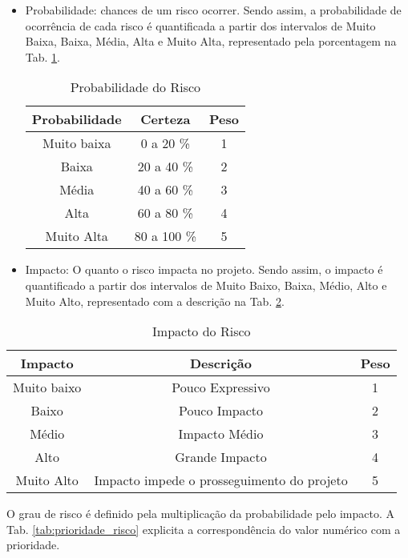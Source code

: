 \begin{itemize}
\item Probabilidade: chances de um risco ocorrer. Sendo assim, a probabilidade de ocorrência de cada risco é quantificada a partir dos intervalos de Muito Baixa, Baixa, Média, Alta e Muito Alta, representado pela porcentagem na Tab. \ref{tab:probabilidade}.

\begin{table}[H]
\centering
\caption{Probabilidade do Risco}
\label{tab:probabilidade}
\begin{tabular}{|c|c|c|}
\hline
\rowcolor[HTML]{A8DADC}
\textbf{Probabilidade} & \textbf{Certeza} & \textbf{Peso} \\ \hline
Muito baixa	 & 0 a 20 \% & 1
 \\ \hline
Baixa & 20 a 40 \% & 2 \\ \hline
Média & 40 a 60 \% & 3 \\ \hline
Alta & 60 a 80 \% & 4 \\ \hline
Muito Alta & 80 a 100 \% & 5 \\ \hline
\end{tabular}
\end{table}

\item Impacto: O quanto o risco impacta no projeto. Sendo assim, o impacto é quantificado a partir dos intervalos de Muito Baixo, Baixa, Médio, Alto e Muito Alto, representado com a descrição na Tab. \ref{tab:impacto}.

\end{itemize}

\begin{table}[H]
\centering
\caption{ Impacto do Risco}
\label{tab:impacto}
\begin{tabular}{|c|c|c|}
\hline
\rowcolor[HTML]{A8DADC}
\textbf{Impacto} & \textbf{Descrição} & \textbf{Peso} \\ \hline
Muito baixo	 & Pouco Expressivo	 & 1
 \\ \hline
Baixo & Pouco Impacto & 2 \\ \hline
Médio & Impacto Médio & 3 \\ \hline
Alto & Grande Impacto & 4 \\ \hline
Muito Alto & Impacto impede o prosseguimento do projeto & 5 \\ \hline
\end{tabular}
\end{table}

O grau de risco é definido pela multiplicação da probabilidade pelo impacto. A Tab. \ref{tab:prioridade_risco} explicita a correspondência do valor numérico com a prioridade.

